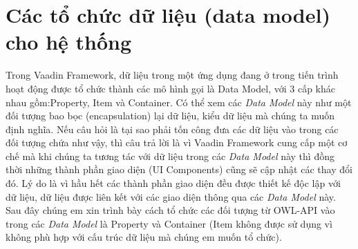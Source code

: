 {\section{Các tổ chức dữ liệu (data model) cho hệ thống}
Trong Vaadin Framework, dữ liệu trong một ứng dụng đang ở trong tiến trình hoạt động được tổ chức thành các mô hình gọi là Data Model, với 3 cấp khác nhau gồm:Property, Item và Container. Có thể xem các \textit{Data Model} này như một đối tượng bao bọc (encapsulation) lại dữ liệu, kiểu dữ liệu mà chúng ta muốn định nghĩa. Nếu câu hỏi là tại sao phải tốn công đưa các dữ liệu vào trong các đối tượng chứa như vậy, thì câu trả lời là vì Vaadin Framework cung cấp một cơ chế mà khi chúng ta tương tác với dữ liệu trong các \textit{Data Model} này thì đồng thời những thành phần giao diện (UI Components) cũng sẽ cập nhật các thay đổi đó. Lý do là vì hầu hết các thành phần giao diện đều được thiết kế độc lập với dữ liệu, dữ liệu được liên kết với các giao diện thông qua các \textit{Data Model} này. Sau đây chúng em xin trình bày cách tổ chức các đối tượng từ OWL-API vào trong các \textit{Data Model} là Property và Container (Item không được sử dụng vì không phù hợp với cấu trúc dữ liệu mà chúng em muốn tổ chức).

}
